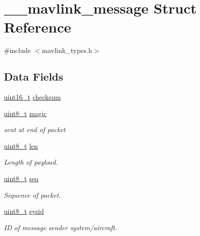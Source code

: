 \hypertarget{struct____mavlink__message}{\section{\-\_\-\-\_\-mavlink\-\_\-message Struct Reference}
\label{struct____mavlink__message}
}


{\ttfamily \#include $<$mavlink\-\_\-types.\-h$>$}

\subsection*{Data Fields}
\begin{DoxyCompactItemize}
\item 
\hyperlink{stdint_8h_a273cf69d639a59973b6019625df33e30}{uint16\-\_\-t} \hyperlink{struct____mavlink__message_a8c200d7751471b5ac54d090ba279a5a6}{checksum}
\item 
\hyperlink{stdint_8h_aba7bc1797add20fe3efdf37ced1182c5}{uint8\-\_\-t} \hyperlink{struct____mavlink__message_a2e6ee9d46821aea33a08231dea000355}{magic}
\begin{DoxyCompactList}\small\item\em sent at end of packet \end{DoxyCompactList}\item 
\hyperlink{stdint_8h_aba7bc1797add20fe3efdf37ced1182c5}{uint8\-\_\-t} \hyperlink{struct____mavlink__message_a6a405c678e4b9fe57e5e621c5bcd4841}{len}
\begin{DoxyCompactList}\small\item\em Length of payload. \end{DoxyCompactList}\item 
\hyperlink{stdint_8h_aba7bc1797add20fe3efdf37ced1182c5}{uint8\-\_\-t} \hyperlink{struct____mavlink__message_aae05bedaab3c62acaccb416478490eff}{seq}
\begin{DoxyCompactList}\small\item\em Sequence of packet. \end{DoxyCompactList}\item 
\hyperlink{stdint_8h_aba7bc1797add20fe3efdf37ced1182c5}{uint8\-\_\-t} \hyperlink{struct____mavlink__message_ad4bfd4108688429b30940a35b44d4dd3}{sysid}
\begin{DoxyCompactList}\small\item\em I\-D of message sender system/aircraft. \end{DoxyCompactList}\item 

\end{DoxyCompactItemize}
